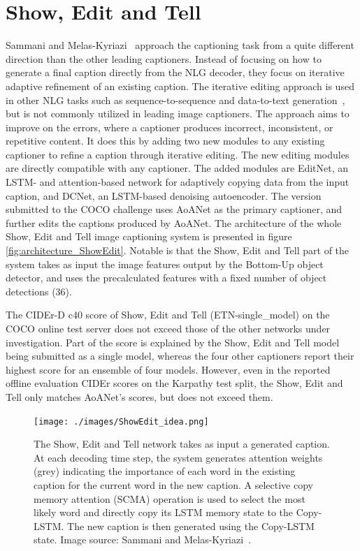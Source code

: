 \documentclass[english,twoside,openright]{HYgraduMLDS}
\begin{document}
\section{Show, Edit and Tell}
Sammani and Melas-Kyriazi~\cite{ShowEdit} approach the captioning task from a quite different direction than the other leading captioners. Instead of focusing on how to generate a final caption directly from the NLG decoder, they focus on iterative adaptive refinement of an existing caption. The iterative editing approach is used in other NLG tasks such as sequence-to-sequence and data-to-text generation~\cite{ShowEdit, datatotext}, but is not commonly utilized in leading image captioners. The approach aims to improve on the errors, where a captioner produces incorrect, inconsistent, or repetitive content. It does this by adding two new modules to any existing captioner to refine a caption through iterative editing. The new editing modules are directly compatible with any captioner. The added modules are EditNet, an LSTM- and attention-based network for adaptively copying data from the input caption, and DCNet, an LSTM-based denoising autoencoder. The version submitted to the COCO challenge uses AoANet as the primary captioner, and further edits the captions produced by AoANet. The architecture of the whole Show, Edit and Tell image captioning system is presented in figure \ref{fig:architecture_ShowEdit}. Notable is that the Show, Edit and Tell part of the system takes as input the image features output by the Bottom-Up object detector, and uses the precalculated features with a fixed number of object detections (36).

The CIDEr-D c40 score of Show, Edit and Tell (ETN-single\_model) on the COCO online test server does not exceed those of the other networks under investigation. Part of the score is explained by the Show, Edit and Tell model being submitted as a single model, whereas the four other captioners report their highest score for an ensemble of four models. However, even in the reported offline evaluation CIDEr scores on the Karpathy test split, the Show, Edit and Tell only matches AoANet's scores, but does not exceed them.

\begin{figure}[h] 
\centering
\texttt{[image: ./images/ShowEdit\_idea.png]}
\caption{The Show, Edit and Tell network takes as input a generated caption. At each decoding time step, the system generates attention weights (grey) indicating the importance of each word in the existing caption for the current word in the new caption. A selective copy memory attention (SCMA) operation is used to select the most likely word and directly copy its LSTM memory state to the Copy-LSTM. The new caption is then generated using the Copy-LSTM state. Image source: Sammani and Melas-Kyriazi~\cite{ShowEdit}.}
\label{fig:ShowEdit_example} 
\end{figure}
\end{document}
